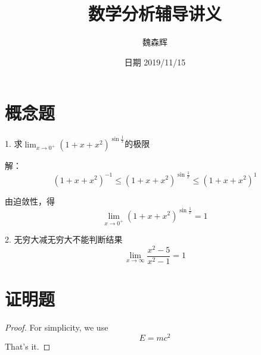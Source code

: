 \documentclass[12pt, a4paper]{ctexart}
\title{数学分析辅导讲义}
\date{日期 2019/11/15}
\author{魏森辉}
\begin{document}
\maketitle{}

\section{概念题}
    

    \begin{flushleft} %
    1. 求$
    \lim _{x \rightarrow 0^{+}}\left(1+x+x^{2}\right)^{\sin \frac{1}{x}}
    $的极限

    解：
    \[
    \left(1+x+x^{2}\right)^{-1} \leqslant\left(1+x+x^{2}\right)^{\sin \frac{1}{x}} \leqslant\left(1+x+x^{2}\right)^{1}
    \]

    由迫敛性，得$$\lim _{x \rightarrow 0^{+}} (1+x+x^2)^{\sin \frac{1}{x}} = 1$$


    2. 无穷大减无穷大不能判断结果
    \[
    \lim _{x \rightarrow \infty} \frac{x^{2}-5}{x^{2}-1}=1
    \]
    \end{flushleft}

\section{证明题}

    \begin{proof} %
    For simplicity, we use
    \[
    E=mc^2
    \]
    That's it.
    \end{proof}
\end{document}

